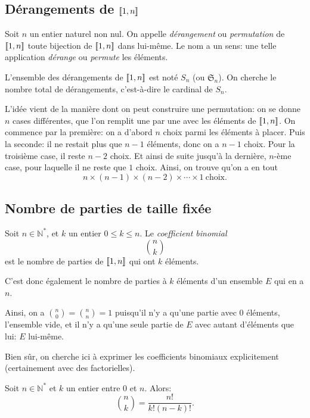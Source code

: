 \documentclass[twoside,11pt]{article}
\newcommand{\N}{\mathbb N}
\DeclarePairedDelimiter{\zint}{[\![}{]\!]}
\theoremstyle{definition}
\theoremstyle{remark}
\theoremstyle{theorem}
\begin{document}
\subsection{Dérangements de $\zint{1,n}$}

Soit $n$ un entier naturel non nul. On appelle \textit{dérangement} ou \textit{permutation} de $\zint{1,n}$ toute bijection de $\zint{1,n}$ dans lui-même. Le nom a un sens: une telle application \textit{dérange} ou \textit{permute} les éléments.

L'ensemble des dérangements de $\zint{1,n}$ est noté $S_n$ (ou $\mathfrak{S}_n$). On cherche le nombre total de dérangements, c'est-à-dire le cardinal de $S_n$.

L'idée vient de la manière dont on peut construire une permutation: on se donne $n$ cases différentes, que l'on remplit une par une avec les éléments de $\zint{1,n}$. On commence par la première: on a d'abord $n$ choix parmi les éléments à placer. Puis la seconde: il ne restait plus que $n-1$ éléments, donc on a $n-1$ choix. Pour la troisième case, il reste $n-2$ choix. Et ainsi de suite jusqu'à la dernière, $n$-ème case, pour laquelle il ne reste que $1$ choix. Ainsi, on trouve qu'on a en tout
\[ n\times (n-1)\times (n-2)\times\cdots\times 1\ \text{choix}. \]



\subsection{Nombre de parties de taille fixée}

\begin{defn}
	Soit $n\in\N^*$, et $k$ un entier $0\leq k\leq n$. Le \textit{coefficient binomial}
	\[
	\binom{n}{k}
	\]
	est le nombre de parties de $\zint{1,n}$ qui ont $k$ éléments.
\end{defn}

C'est donc également le nombre de parties à $k$ éléments d'un ensemble $E$ qui en a $n$.

Ainsi, on a $\binom{n}{0} = \binom{n}{n} = 1$ puisqu'il n'y a qu'une partie avec 0 éléments, l'ensemble vide, et il n'y a qu'une seule partie de $E$ avec autant d'éléments que lui: $E$ lui-même.

Bien sûr, on cherche ici à exprimer les coefficients binomiaux explicitement (certainement avec des factorielles).

\begin{prop}
	Soit $n\in\N^*$ et $k$ un entier entre 0 et $n$. Alors:
	\[
	\binom{n}{k} = \frac{n!}{k!(n-k)!}.
	\]
\end{prop}
\end{document}
